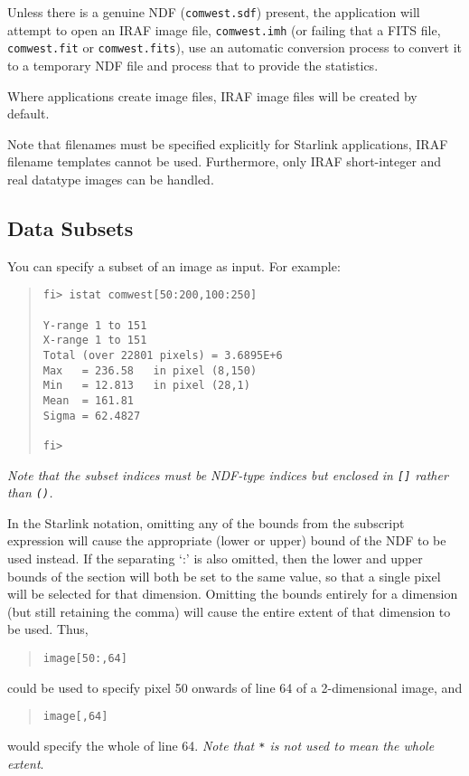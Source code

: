 \documentclass[twoside,11pt]{article}
\newcommand{\htmlref}[2]{#1}
\newcommand{\xref}[3]{#1}
\newcommand{\xlabel}[1]{}
\begin{document}
Unless there is a genuine NDF ({\texttt{comwest.sdf}}) present, the application 
will attempt to open an IRAF image file, \texttt{comwest.imh} (or failing that
a FITS file, \texttt{comwest.fit} or \texttt{comwest.fits}), use an
\htmlref{automatic conversion process}{more_on_automatic_data_conversion} 
to convert it to a temporary NDF file and process that to provide the 
statistics.

Where applications create image files, IRAF image files will be created by 
default.

Note that filenames must be specified explicitly for Starlink applications,
IRAF filename templates cannot be used.
Furthermore, only IRAF short-integer and real datatype images can be handled.

\subsection{\xlabel{data_subsets}Data Subsets}
You can specify a subset of an image as input. For example:
\begin{quote} \begin{verbatim}
fi> istat comwest[50:200,100:250]

Y-range 1 to 151
X-range 1 to 151
Total (over 22801 pixels) = 3.6895E+6
Max   = 236.58   in pixel (8,150)
Min   = 12.813   in pixel (28,1)
Mean  = 161.81
Sigma = 62.4827

fi>
\end{verbatim} \end{quote}
\emph{Note that the subset indices must be 
\xref{NDF-type indices}{sun33}{using_subscripts_to_access_ndf_sections}
 but enclosed in \texttt{[]} rather than 
\texttt{()}.}

In the Starlink notation, omitting any of the bounds from the subscript 
expression will cause the appropriate (lower or upper) bound of the NDF to be 
used instead. 
If the separating `:' is also omitted, then the lower and upper bounds of the 
section will both be set to the same value, so that a single pixel will be 
selected for that dimension. Omitting the bounds entirely for a dimension (but
still retaining the comma) will cause the entire extent of that dimension to 
be used.
Thus, 
\begin{quote} \begin{verbatim}
image[50:,64]
\end{verbatim} \end{quote}
could be used to specify pixel 50 onwards of line 64 of a 2-dimensional image,
and
\begin{quote} \begin{verbatim}
image[,64]
\end{verbatim} \end{quote}
would specify the whole of line 64.
\emph{Note that \texttt{*} is not used to mean the whole extent}.
\end{document}

